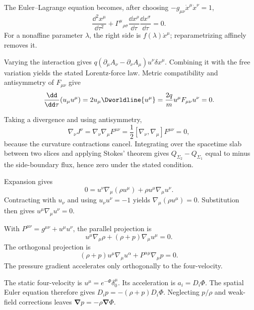 \begin{solutions}

\begin{solution}
The Euler--Lagrange equation becomes, after choosing
\(-g_{\mu\nu}\dot x^\mu\dot x^\nu=1\),
\[
\frac{\dd^2x^\mu}{\dd\tau^2}
+\Gamma^\mu{}_{\rho\sigma}
\frac{\dd x^\rho}{\dd\tau}\frac{\dd x^\sigma}{\dd\tau}=0.
\]
For a nonaffine parameter \(\lambda\), the right side is
\(f(\lambda)\dot x^\mu\); reparametrizing affinely removes it.
\end{solution}

\begin{solution}
Varying the interaction gives
\(q(\partial_\mu A_\nu-\partial_\nu A_\mu)u^\nu\delta x^\mu\).
Combining it with the free variation yields the stated Lorentz-force law.
Metric compatibility and antisymmetry of \(F_{\mu\nu}\) give
\[
\frac{\dd}{\dd\tau}(u_\mu u^\mu)
=2u_\mu\Dworldline{u^\mu}
=\frac{2q}{m}u^\mu F_{\mu\nu}u^\nu=0.
\]
\end{solution}

\begin{solution}
Taking a divergence and using antisymmetry,
\[
\nabla_\nu J^\nu
=\nabla_\nu\nabla_\mu F^{\mu\nu}
=\frac12[\nabla_\nu,\nabla_\mu]F^{\mu\nu}=0,
\]
because the curvature contractions cancel.  Integrating over the spacetime
slab between two slices and applying Stokes' theorem gives
\(Q_{\Sigma_2}-Q_{\Sigma_1}\) equal to minus the side-boundary flux, hence
zero under the stated condition.
\end{solution}

\begin{solution}
Expansion gives
\[
0=u^\nu\nabla_\mu(\rho u^\mu)+\rho u^\mu\nabla_\mu u^\nu.
\]
Contracting with \(u_\nu\) and using \(u_\nu u^\nu=-1\) yields
\(\nabla_\mu(\rho u^\mu)=0\).  Substitution then gives
\(u^\mu\nabla_\mu u^\nu=0\).
\end{solution}

\begin{solution}
With
\(P^{\mu\nu}=g^{\mu\nu}+u^\mu u^\nu\), the parallel projection is
\[
u^\mu\nabla_\mu\rho+(\rho+p)\nabla_\mu u^\mu=0.
\]
The orthogonal projection is
\[
(\rho+p)u^\mu\nabla_\mu u^\alpha
+P^{\alpha\mu}\nabla_\mu p=0.
\]
The pressure gradient accelerates only orthogonally to the four-velocity.
\end{solution}

\begin{solution}
The static four-velocity is \(u^\mu=e^{-\Phi}\delta^\mu_0\).  Its acceleration
is \(a_i=D_i\Phi\).  The spatial Euler equation therefore gives
\(D_ip=-(\rho+p)D_i\Phi\).  Neglecting \(p/\rho\) and weak-field corrections
leaves \(\bm\nabla p=-\rho\bm\nabla\Phi\).
\end{solution}


\end{solutions}
